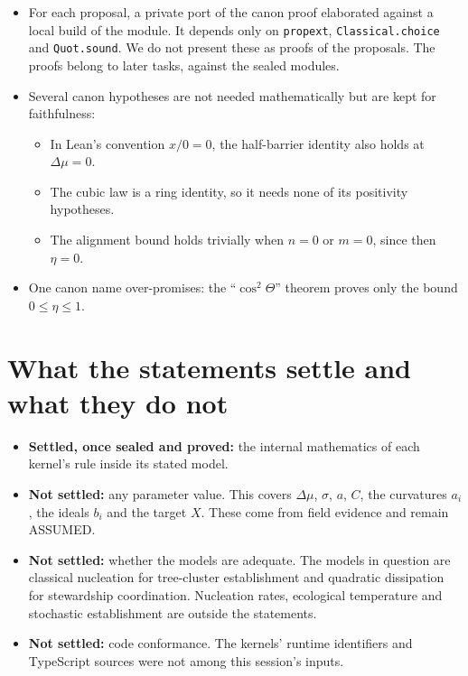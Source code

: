 \documentclass[11pt]{article}
\theoremstyle{definition}
\theoremstyle{remark}
\begin{document}
\begin{itemize}
\item For each proposal, a private port of the canon proof elaborated against a local build of the module.
It depends only on \texttt{propext}, \texttt{Classical.choice} and \texttt{Quot.sound}.
We do not present these as proofs of the proposals. The proofs belong to later tasks, against the sealed modules.
\item Several canon hypotheses are not needed mathematically but are kept for faithfulness:
\begin{itemize}
\item In Lean's convention $x/0=0$, the half-barrier identity also holds at $\Delta\mu=0$.
\item The cubic law is a ring identity, so it needs none of its positivity hypotheses.
\item The alignment bound holds trivially when $n=0$ or $m=0$, since then $\eta=0$.
\end{itemize}
\item One canon name over-promises: the ``$\cos^2\Theta$'' theorem proves only the bound $0\le\eta\le1$.
\end{itemize}

\section{What the statements settle and what they do not}
\begin{itemize}
\item \textbf{Settled, once sealed and proved:} the internal mathematics of each kernel's rule inside its stated model.
\item \textbf{Not settled:} any parameter value. This covers $\Delta\mu$, $\sigma$, $a$, $C$, the curvatures $a_i$, the ideals $b_i$ and the target $X$.
These come from field evidence and remain ASSUMED.
\item \textbf{Not settled:} whether the models are adequate. The models in question are classical nucleation for tree-cluster establishment and
quadratic dissipation for stewardship coordination. Nucleation rates, ecological temperature and stochastic establishment are outside the statements.
\item \textbf{Not settled:} code conformance. The kernels' runtime identifiers and TypeScript sources were not among this session's inputs.
\end{itemize}
\end{document}
